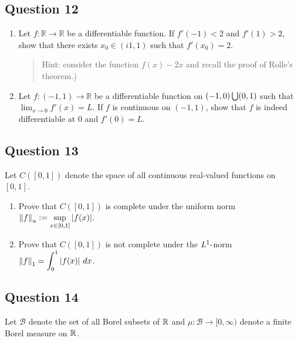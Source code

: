 \documentclass[12pt]{article}
\providecommand{\tightlist}{%
  \setlength{\itemsep}{0pt}\setlength{\parskip}{0pt}}
\begin{document}
\hypertarget{question-12-1}{%
\subsection{Question 12}\label{question-12-1}}

\begin{enumerate}
\def\labelenumi{(\alph{enumi})}
\item
  Let \(f : \mathbb{R} \to \mathbb{R}\) be a differentiable function. If
  \(f'(-1) < 2\) and \(f'(1) > 2\), show that there exists
  \(x_0 \in (i1, 1)\) such that \(f'(x_0) = 2\).

  \begin{quote}
  Hint: consider the function \(f(x) - 2x\) and recall the proof of
  Rolle's theorem.)
  \end{quote}
\item
  Let \(f : (-1, 1) \to \mathbb{R}\) be a differentiable function on
  \((-1, 0) \bigcup (0, 1)\) such that \(\lim_{x\to 0} f'(x) = L\). If
  \(f\) is continuous on \((-1, 1)\), show that \(f\) is indeed
  differentiable at \(0\) and \(f'(0) = L\).
\end{enumerate}

\hypertarget{question-13-1}{%
\subsection{Question 13}\label{question-13-1}}

Let \(C([0, 1])\) denote the space of all continuous real-valued
functions on \([0, 1]\).

\begin{enumerate}
\def\labelenumi{\alph{enumi}.}
\tightlist
\item
  Prove that \(C([0, 1])\) is complete under the uniform norm
  \({\left\lVert {f} \right\rVert}_u := \displaystyle\sup_{x\in [0,1]} |f (x)|\).
\item
  Prove that \(C([0, 1])\) is not complete under the \(L^1{\hbox{-}}\)norm
  \({\left\lVert {f} \right\rVert}_1 = \displaystyle\int_0^1 |f (x)| ~dx\).
\end{enumerate}

\hypertarget{question-14-1}{%
\subsection{Question 14}\label{question-14-1}}

Let \(\mathcal B\) denote the set of all Borel subsets of \({\mathbb{R}}\) and
\(\mu : \mathcal B \to [0, \infty)\) denote a finite Borel measure on
\({\mathbb{R}}\).
\end{document}
